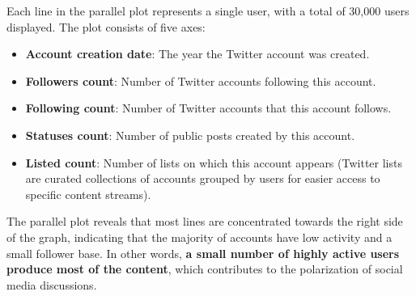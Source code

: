\documentclass[a4paper,12pt,titlepage,leqno]{article}
\begin{document}
Each line in the parallel plot represents a single user, with a total of 30,000 users displayed. The plot consists of five axes:
\begin{itemize}
\item \textbf{Account creation date}: The year the Twitter account was created.
\item \textbf{Followers count}: Number of Twitter accounts following this account.
\item \textbf{Following count}: Number of Twitter accounts that this account follows.
\item \textbf{Statuses count}: Number of public posts created by this account.
\item \textbf{Listed count}: Number of lists on which this account appears (Twitter lists are curated collections of accounts grouped by users for easier access to specific content streams).
\end{itemize}

The parallel plot reveals that most lines are concentrated towards the right side of the graph, indicating that the majority of accounts have low activity and a small follower base. In other words, \textbf{a small number of highly active users produce most of the content}, which contributes to the polarization of social media discussions.
\end{document}
